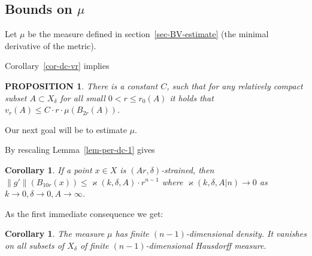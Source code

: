 \documentclass[12pt,leqno,intlimits]{amsart}
\numberwithin{equation}{section}
\newtheorem{lem}[thm]{Lemma}
\newtheorem{cor}[thm]{Corollary}
\newtheorem{prop}[thm]{PROPOSITION}
\theoremstyle{definition}
\theoremstyle{remark}
\newcommand{\curv}{\mathop{\rm curv}}
\begin{document}
\subsection{Bounds on $\mu$}

 Let
 $\mu$ be the measure defined in  section~\ref{sec-BV-estimate}
 (the minimal derivative of the metric).





Corollary~\ref{cor-dc-vr} implies

 \begin{prop} \label{mainalex}
 There is a constant $C$,
 such that  for any relatively compact subset $A\subset X_\delta$ for all small
 $0<r\leq r_0 (A)$  it holds that  $v_r (A) \leq C \cdot r\cdot \mu  ( B_{2r} (A))$.
 \end{prop}

Our next goal will be to estimate $\mu$.



By rescaling Lemma~\ref{lem-per-dc-1} gives

 \begin{cor}  \label{ballmeasure}
 If a point $x\in X$ is $(Ar,\delta )$-strained, then $\|g'\| (B_{10r} (x) ) \leq \varkappa(k,\delta,A)  \cdot r^{n-1}$ where $\varkappa(k,\delta,A|n)\to 0$ as $k\to 0, \delta\to 0,A\to\infty$.
 \end{cor}



As the first immediate consequence we get:

\begin{cor}\label{cor-n-1-density}
The measure $\mu$ has finite $(n-1)$-dimensional density. It vanishes on all subsets of $X_\delta$ of finite $(n-1)$-dimensional
Hausdorff measure.
\end{cor}
\end{document}
